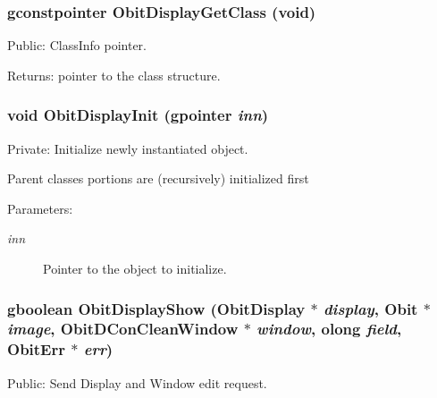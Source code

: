 \subsubsection{\setlength{\rightskip}{0pt plus 5cm}gconstpointer Obit\-Display\-Get\-Class (void)}\label{ObitDisplay_8c_a13}


Public: Class\-Info pointer. 

\begin{Desc}
\item[Returns:]pointer to the class structure. \end{Desc}
\subsubsection{\setlength{\rightskip}{0pt plus 5cm}void Obit\-Display\-Init (gpointer {\em inn})}\label{ObitDisplay_8c_a3}


Private: Initialize newly instantiated object. 

Parent classes portions are (recursively) initialized first \begin{Desc}
\item[Parameters:]
\begin{description}
\item[{\em inn}]Pointer to the object to initialize. \end{description}
\end{Desc}
\subsubsection{\setlength{\rightskip}{0pt plus 5cm}gboolean Obit\-Display\-Show ({\bf Obit\-Display} $\ast$ {\em display}, {\bf Obit} $\ast$ {\em image}, {\bf Obit\-DCon\-Clean\-Window} $\ast$ {\em window}, {\bf olong} {\em field}, {\bf Obit\-Err} $\ast$ {\em err})}\label{ObitDisplay_8c_a15}


Public: Send Display and Window edit request. 

